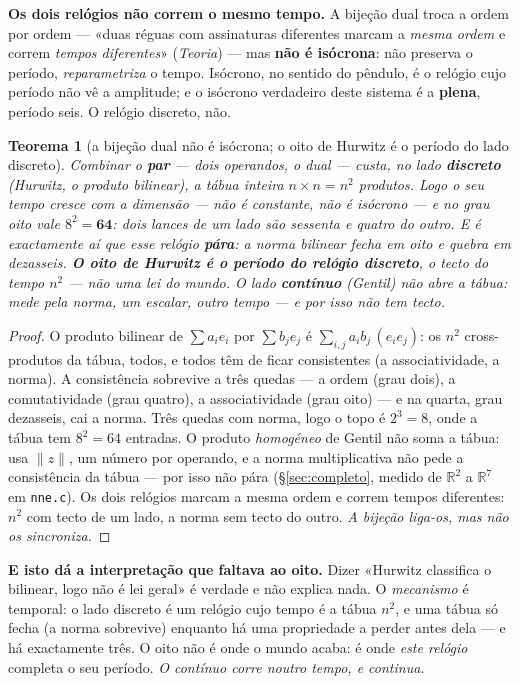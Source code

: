 \documentclass[11pt,a4paper]{article}
\newcommand{\code}[1]{\texttt{\small #1}}
\newtheorem{teorema}{Teorema}
\begin{document}
\textbf{Os dois relógios não correm o mesmo tempo.} A bijeção dual troca a ordem por ordem --- «duas
réguas com assinaturas diferentes marcam a \emph{mesma ordem} e correm \emph{tempos diferentes}»
(\emph{Teoria}) --- mas \textbf{não é isócrona}: não preserva o período, \emph{reparametriza} o tempo.
Isócrono, no sentido do pêndulo, é o relógio cujo período não vê a amplitude; e o isócrono verdadeiro
deste sistema é a \textbf{plena}, período seis. O relógio discreto, não.

\begin{teorema}[a bijeção dual não é isócrona; o oito de Hurwitz é o período do lado discreto]\label{thm:isocrona}
Combinar o \textbf{par} --- dois operandos, o dual --- custa, no lado \textbf{discreto} (Hurwitz, o
produto bilinear), a tábua inteira $n\times n=n^2$ produtos. Logo o seu \emph{tempo} cresce com a
dimensão --- não é constante, não é isócrono --- e no grau oito vale $8^2=\mathbf{64}$: \emph{dois
lances de um lado são sessenta e quatro do outro}. E é exactamente aí que esse relógio \textbf{pára}:
a norma bilinear fecha em oito e quebra em dezasseis. \textbf{O oito de Hurwitz é o período do relógio
discreto}, o tecto do tempo $n^2$ --- não uma lei do mundo. O lado \textbf{contínuo} (Gentil) não abre
a tábua: mede pela \emph{norma}, um escalar, outro tempo --- e por isso não tem tecto.
\end{teorema}

\begin{proof}
O produto bilinear de $\sum a_i e_i$ por $\sum b_j e_j$ é $\sum_{i,j} a_ib_j\,(e_ie_j)$: os $n^2$
cross-produtos da tábua, todos, e todos têm de ficar consistentes (a associatividade, a norma). A
consistência sobrevive a três quedas --- a ordem (grau dois), a comutatividade (grau quatro), a
associatividade (grau oito) --- e na quarta, grau dezasseis, cai a norma. Três quedas com norma, logo
o topo é $2^3=8$, onde a tábua tem $8^2=64$ entradas. O produto \emph{homogéneo} de Gentil não soma a
tábua: usa $\|z\|$, um número por operando, e a norma multiplicativa não pede a consistência da tábua
--- por isso não pára (§\ref{sec:completo}, medido de $\mathbb{R}^2$ a $\mathbb{R}^7$ em \code{nne.c}).
Os dois relógios marcam a mesma ordem e correm tempos diferentes: $n^2$ com tecto de um lado, a norma
sem tecto do outro. \emph{A bijeção liga-os, mas não os sincroniza.}
\end{proof}

\noindent \textbf{E isto dá a interpretação que faltava ao oito.} Dizer «Hurwitz classifica o
bilinear, logo não é lei geral» é verdade e não explica nada. O \emph{mecanismo} é temporal: o lado
discreto é um relógio cujo tempo é a tábua $n^2$, e uma tábua só fecha (a norma sobrevive) enquanto
há uma propriedade a perder antes dela --- e há exactamente três. O oito não é onde o mundo acaba: é
onde \emph{este relógio} completa o seu período. \emph{O contínuo corre noutro tempo, e continua.}
\end{document}
